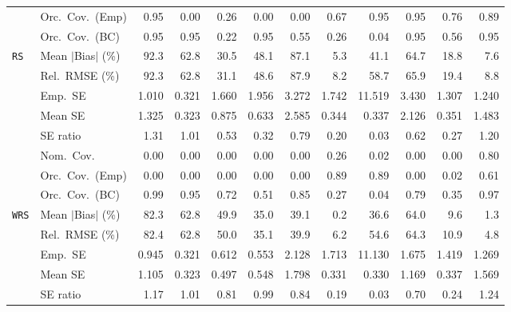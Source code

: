 \begin{landscape}
\begin{longtable}{llrrrrrrrrrr}
 & Orc.\ Cov.\ (Emp) & \cellcolor{ranktwo}0.95 & 0.00 & 0.26 & 0.00 & 0.00 & 0.67 & \cellcolor{rankone}0.95 & \cellcolor{rankthree}0.95 & 0.76 & 0.89 \\
 & Orc.\ Cov.\ (BC) & \cellcolor{rankone}0.95 & 0.95 & 0.22 & \cellcolor{ranktwo}0.95 & 0.55 & 0.26 & 0.04 & 0.95 & 0.56 & \cellcolor{rankthree}0.95 \\
\addlinespace[2pt]
\quad \texttt{RS} & Mean $|$Bias$|$ (\%) & 92.3 & 62.8 & 30.5 & 48.1 & 87.1 & \cellcolor{rankone}5.3 & 41.1 & 64.7 & \cellcolor{rankthree}18.8 & \cellcolor{ranktwo}7.6 \\
 & Rel.\ RMSE (\%) & 92.3 & 62.8 & 31.1 & 48.6 & 87.9 & \cellcolor{rankone}8.2 & 58.7 & 65.9 & \cellcolor{rankthree}19.4 & \cellcolor{ranktwo}8.8 \\
 & Emp.\ SE & 1.010 & 0.321 & 1.660 & 1.956 & 3.272 & 1.742 & 11.519 & 3.430 & 1.307 & 1.240 \\
 & Mean SE & 1.325 & 0.323 & 0.875 & 0.633 & 2.585 & 0.344 & 0.337 & 2.126 & 0.351 & 1.483 \\
 & SE ratio & 1.31 & \cellcolor{rankone}1.01 & 0.53 & 0.32 & \cellcolor{rankthree}0.79 & 0.20 & 0.03 & 0.62 & 0.27 & \cellcolor{ranktwo}1.20 \\
 & Nom.\ Cov. & 0.00 & 0.00 & 0.00 & 0.00 & 0.00 & \cellcolor{ranktwo}0.26 & \cellcolor{rankthree}0.02 & 0.00 & 0.00 & \cellcolor{rankone}0.80 \\
 & Orc.\ Cov.\ (Emp) & 0.00 & 0.00 & 0.00 & 0.00 & 0.00 & \cellcolor{ranktwo}0.89 & \cellcolor{rankone}0.89 & 0.00 & 0.02 & \cellcolor{rankthree}0.61 \\
 & Orc.\ Cov.\ (BC) & \cellcolor{rankthree}0.99 & \cellcolor{rankone}0.95 & 0.72 & 0.51 & 0.85 & 0.27 & 0.04 & 0.79 & 0.35 & \cellcolor{ranktwo}0.97 \\
\addlinespace[2pt]
\quad \texttt{WRS} & Mean $|$Bias$|$ (\%) & 82.3 & 62.8 & 49.9 & 35.0 & 39.1 & \cellcolor{rankone}0.2 & 36.6 & 64.0 & \cellcolor{rankthree}9.6 & \cellcolor{ranktwo}1.3 \\
 & Rel.\ RMSE (\%) & 82.4 & 62.8 & 50.0 & 35.1 & 39.9 & \cellcolor{ranktwo}6.2 & 54.6 & 64.3 & \cellcolor{rankthree}10.9 & \cellcolor{rankone}4.8 \\
 & Emp.\ SE & 0.945 & 0.321 & 0.612 & 0.553 & 2.128 & 1.713 & 11.130 & 1.675 & 1.419 & 1.269 \\
 & Mean SE & 1.105 & 0.323 & 0.497 & 0.548 & 1.798 & 0.331 & 0.330 & 1.169 & 0.337 & 1.569 \\
 & SE ratio & 1.17 & \cellcolor{rankone}1.01 & 0.81 & \cellcolor{ranktwo}0.99 & \cellcolor{rankthree}0.84 & 0.19 & 0.03 & 0.70 & 0.24 & 1.24 \\

\end{longtable}
\end{landscape}

